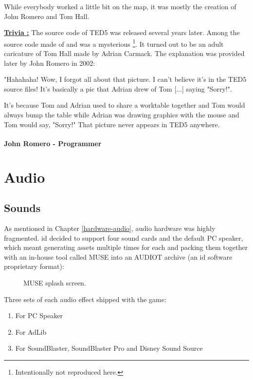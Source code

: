 \documentclass[book.tex]{subfiles}
\begin{document}
\par
While everybody worked a little bit on the map, it was mostly the creation of John Romero and Tom Hall.\\
\par
 \textbf{\underline{Trivia :}} The source code of TED5 was released several years later. Among the source code made of  and  was a mysterious \footnote{Intentionally not reproduced here.}. It turned out to be an adult caricature of Tom Hall made by Adrian Carmack. The explanation was provided later by John Romero in 2002:\\
\par
 \begin{fancyquotes}
   "Hahahaha! Wow, I forgot all about that picture. I can't believe it's 
in the TED5 source files! It's basically a pic that Adrian drew of Tom 
[...] saying "Sorry!".\\
\par 
It's because Tom and Adrian used to share a worktable together and Tom 
would always bump the table while Adrian was drawing graphics with the 
mouse and Tom would say, "Sorry!" That picture never appears in TED5 
anywhere.\\
   \\
\textbf{John Romero - Programmer}
 \end{fancyquotes}











\section{Audio}

\subsection{Sounds}
As mentioned in Chapter \ref{hardware-audio}, audio hardware was highly fragmented. id decided to support four sound cards and the default PC speaker, which meant generating assets multiple times for each and packing them together with an in-house tool called MUSE into an AUDIOT archive (an id software proprietary format):\\
\begin{figure}[H]
\centering

  \caption{MUSE splash screen.}
 \end{figure}
 \par
 Three sets of each audio effect shipped with the game:
\begin{enumerate}
\item For PC Speaker
\item For AdLib
\item For SoundBlaster, SoundBlaster Pro and Disney Sound Source
\end{enumerate}
\end{document}
